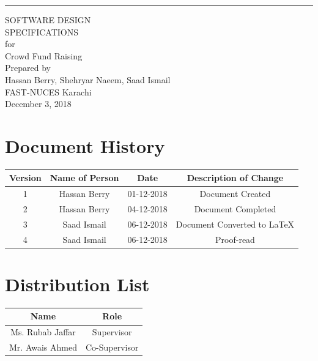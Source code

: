 \documentclass{scrreprt}
\date{}
\begin{document}
\begin{flushright}
    \rule{16cm}{5pt}\vskip1cm
    \begin{bfseries}
        \Huge{SOFTWARE DESIGN\\ SPECIFICATIONS}\\
        \vspace{1.9cm}
        for\\
        \vspace{1.9cm}
        Crowd Fund Raising\\
        \vspace{1.9cm}
        Prepared by\\Hassan Berry, Shehryar Naeem, Saad Ismail\\
        \vspace{1.9cm}
        FAST-NUCES Karachi\\
        \vspace{1.9cm}
        December 3, 2018\\
    \end{bfseries}
\end{flushright}

\chapter*{Document History}

\begin{center}
    \begin{tabular}{|c|c|c|c|}
        \hline
	    Version & Name of Person & Date & Description of Change\\
        \hline
	    1 & Hassan Berry & 01-12-2018 & Document Created\\
        \hline
        2 & Hassan Berry & 04-12-2018 & Document Completed\\
        \hline
        3 & Saad Ismail & 06-12-2018 & Document Converted to LaTeX\\
        \hline
        4 & Saad Ismail & 06-12-2018 & Proof-read\\
        \hline
        
    \end{tabular}
\end{center}

\chapter*{Distribution List}

\begin{center}
    \begin{tabular}{|c|c|}
        \hline
	    Name & Role\\
        \hline
	    Ms. Rubab Jaffar & Supervisor\\
        \hline
	    Mr. Awais Ahmed & Co-Supervisor\\
        \hline
    \end{tabular}
\end{center}
\end{document}
